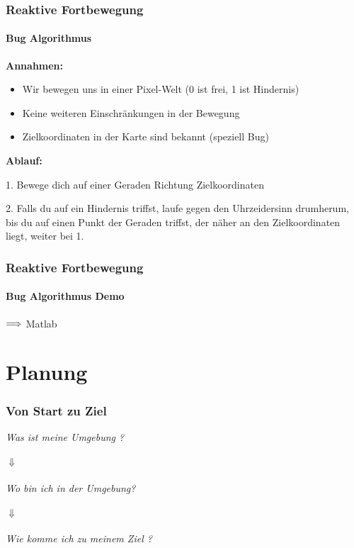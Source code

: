 \documentclass{beamer}
\begin{document}
\begin{frame}
\frametitle{Reaktive Fortbewegung}
\framesubtitle{Bug Algorithmus}

\begin{center}
\textbf{Annahmen:}
\begin{itemize}
\item Wir bewegen uns in einer Pixel-Welt (0 ist frei, 1 ist Hindernis)
\item Keine weiteren Einschränkungen in der Bewegung
\item Zielkoordinaten in der Karte sind bekannt (speziell Bug)\\

\end{itemize}

\textbf{Ablauf:}

1. Bewege dich auf einer Geraden Richtung Zielkoordinaten

 2. Falls du auf ein Hindernis triffst, laufe gegen den Uhrzeidersinn drumherum, bis du auf einen Punkt der Geraden triffst, der näher an den 			Zielkoordinaten liegt, weiter bei 1.

\end{center}

\end{frame}

\begin{frame}
\frametitle{Reaktive Fortbewegung}
\framesubtitle{Bug Algorithmus Demo}
\begin{center}
${\Huge \Longrightarrow}$ {\Large Matlab}
\end{center}
\end{frame}





\section{Planung}

 \begin{frame}
\frametitle{Von Start zu Ziel }
\begin{center}
{\large \textit{Was ist meine Umgebung ?}} \\ 
\quad \\
\pause
	{\Huge$\Downarrow$}\\
\quad \\

{\large \textit{Wo bin ich in der Umgebung?}}\\
\quad \\
\pause
	{\Huge$\Downarrow$}\\
\quad \\
{\large \textit{Wie komme ich zu meinem Ziel ?}}\\
\end{center}

\end{frame}
\end{document}
